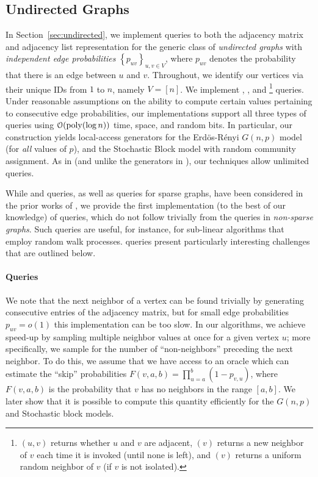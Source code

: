 \subsection{Undirected Graphs}
\label{sec:undirected_graphs}
In Section~\ref{sec:undirected}, we implement queries to both the adjacency matrix and adjacency list representation
for the generic class of \emph{undirected graphs} with {\em independent edge probabilities} $\left\{ p_{uv} \right\}_{u,v\in V}$,
where $p_{uv}$ denotes the probability that there is an edge between $u$ and $v$.
Throughout, we identify our vertices via their unique IDs from $1$ to $n$, namely $V = [n]$.
We implement , , and 
\footnote{$(u,v)$ returns whether $u$ and $v$ are adjacent, $(v)$ returns a new neighbor of $v$ each time
it is invoked (until none is left), and $(v)$ returns a uniform random neighbor of $v$ (if $v$ is not isolated).} queries.
Under reasonable assumptions on the ability to compute certain values pertaining to consecutive edge probabilities,
our implementations support all three types of queries using $\mathcal{O}(\mathrm{poly}(\log n))$ time, space, and random bits.
In particular, our construction yields local-access generators for the Erd\"{o}s-R\'{e}nyi $G(n,p)$ model (for \emph{all} values of $p$),
and the Stochastic Block model with random community assignment.
As in \cite{reut} (and unlike the generators in \cite{huge_old,huge,sparse}), our techniques allow unlimited queries.

While  and  queries, as well as  queries for sparse graphs,
have been considered in the prior works of \cite{reut, huge_old, huge, sparse}, we provide the first implementation (to the best of our knowledge)
of  queries, which do not follow trivially from the  queries in \emph{non-sparse graphs}.
Such queries are useful, for instance, for sub-linear algorithms that employ random walk processes.
 queries present particularly interesting challenges that are outlined below.

\paragraph*{ Queries}
\label{par:next_neighbor_queries}
We note that the next neighbor of a vertex can be found trivially by generating consecutive entries of the adjacency matrix,
but for small edge probabilities $p_{uv} = o(1)$ this implementation can be too slow.
In our algorithms, we achieve speed-up by sampling multiple neighbor values at once for a given vertex $u$; more specifically,
we sample for the number of ``non-neighbors'' preceding the next neighbor.
To do this, we assume that we have access to an oracle which can estimate the ``skip'' probabilities $F(v,a,b)=\prod^{b}_{u=a} (1-p_{v,u})$,
where $F(v,a,b)$ is the probability that $v$ has no neighbors in the range $[a,b]$.
We later show that it is possible to compute this quantity efficiently for the $G(n,p)$ and Stochastic block models.

